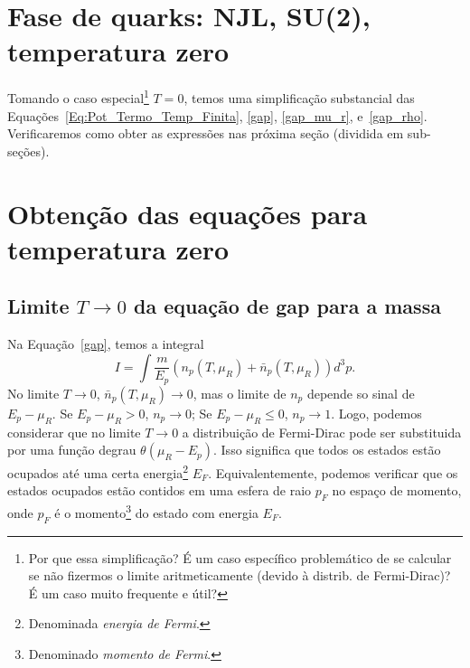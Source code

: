 \section{Fase de quarks: NJL, SU(2), temperatura zero}

Tomando o caso especial\footnote{Por que essa simplificação? É um caso específico problemático de se calcular se não fizermos o limite aritmeticamente (devido à distrib. de Fermi-Dirac)? É um caso muito frequente e útil?} $T = 0$, temos uma simplificação substancial das Equações~\eqref{Eq:Pot_Termo_Temp_Finita}, \eqref{gap}, \eqref{gap_mu_r}, e~\eqref{gap_rho}. Verificaremos como obter as expressões nas próxima seção (dividida em sub-seções).

\section{Obtenção das equações para temperatura zero}
\label{Sec:Obtencao_eq_temp_zero_NJL_quarks}

\subsection{Limite $T \to 0$ da equação de gap para a massa}

Na Equação~\eqref{gap}, temos a integral
\begin{equation}
	I = \int \frac{m}{E_p} (n_p(T, \mu_R) + \bar{n}_p(T, \mu_R)) d^3p.
\end{equation}
%
No limite $T \to 0$, $\bar{n}_p(T, \mu_R) \to 0$, mas o limite de $n_p$ depende so sinal de $E_p - \mu_R$. Se $E_p - \mu_R > 0$, $n_p \to 0$; Se $E_p - \mu_R \leqslant 0$, $n_p \to 1$. Logo, podemos considerar que no limite $T \to 0$ a distribuição de Fermi-Dirac pode ser substituida por uma função degrau $\theta(\mu_R - E_p)$. Isso significa que todos os estados estão ocupados até uma certa energia\footnote{Denominada \emph{energia de Fermi}.} $E_F$. Equivalentemente, podemos verificar que os estados ocupados estão contidos em uma esfera de raio $p_F$ no espaço de momento, onde $p_F$ é o momento\footnote{Denominado \emph{momento de Fermi}.} do estado com energia $E_F$. 

